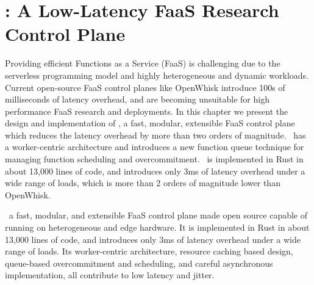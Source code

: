 \chapter{\sysname: A Low-Latency FaaS Research Control Plane}
\label{chap:iluvatar}

Providing efficient Functions as a Service (FaaS) is challenging due to the serverless programming model and highly heterogeneous and dynamic workloads. 
Current open-source FaaS control planes like OpenWhisk introduce 100s of milliseconds of latency overhead, and are becoming unsuitable for high performance FaaS research and deployments.
In this chapter we present the design and implementation of \sysname, a fast, modular, extensible FaaS control plane which reduces the latency overhead by more than two orders of magnitude.
\sysname~has a worker-centric architecture and introduces a new function queue technique for managing function scheduling and overcommitment. 
\sysname~is implemented in Rust in about 13,000 lines of code, and introduces only 3ms of latency overhead under a wide range of loads, which is more than 2 orders of magnitude lower than OpenWhisk. 














\sysname~a fast, modular, and extensible FaaS control plane made open source capable of running on heterogeneous and edge hardware. 
It is implemented in Rust in about 13,000 lines of code, and introduces only 3ms of latency overhead under a wide range of loads.
Its worker-centric architecture, resource caching based design, queue-based overcommitment and scheduling, and careful asynchronous implementation, all contribute to low latency and jitter. 
